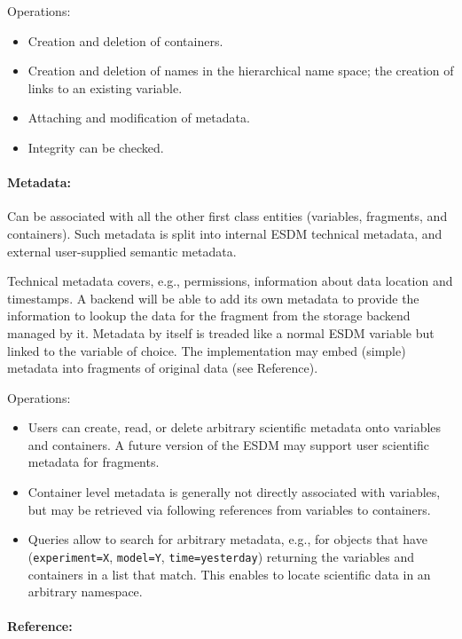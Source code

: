 Operations:

\begin{itemize}
  \item Creation and deletion of containers.
  \item Creation and deletion of names in the hierarchical name space; the creation of links to an existing variable.
  \item Attaching and modification of metadata.
  \item Integrity can be checked.
\end{itemize}

\paragraph{Metadata:}%
\label{metadata-1}

Can be associated with all the other first class entities (variables, fragments, and containers). Such metadata is split into internal ESDM technical metadata, and external user-supplied semantic metadata.

Technical metadata covers, e.g., permissions, information about data location and timestamps.
A backend will be able to add its own metadata to provide the information to lookup the data for the fragment from the storage backend managed by it.
Metadata by itself is treaded like a normal ESDM variable but linked to the variable of choice.
The implementation may embed (simple) metadata into fragments of original data (see Reference).
 
Operations:

\begin{itemize}
  \item Users can create, read, or delete arbitrary scientific metadata onto variables and containers. A future version of the ESDM may support user scientific metadata for fragments.
  \item Container level metadata is generally not directly associated with variables, but may be retrieved via following references from variables to containers.
  \item Queries allow to search for arbitrary metadata, e.g., for objects that have (\texttt{experiment=X}, \texttt{model=Y}, \texttt{time=yesterday}) returning the variables and containers in a list that match. This enables to locate scientific data in an arbitrary namespace.
\end{itemize}

\paragraph{Reference:}%
\label{reference}

